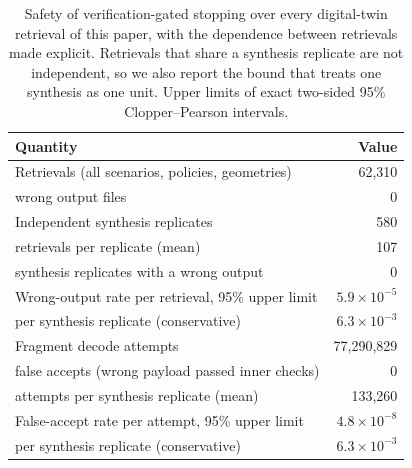\begin{table}[!t]
\centering
\caption{Safety of verification-gated stopping over every digital-twin retrieval of this paper, with the dependence between retrievals made explicit.  Retrievals that share a synthesis replicate are not independent, so we also report the bound that treats one synthesis as one unit.  Upper limits of exact two-sided 95\% Clopper--Pearson intervals.}
\label{tab:safety}
\scriptsize
\begin{tabular}{@{}lr@{}}
\toprule
Quantity & Value \\
\midrule
Retrievals (all scenarios{,} policies{,} geometries) & 62{,}310 \\
\quad wrong output files & 0 \\
Independent synthesis replicates & 580 \\
\quad retrievals per replicate (mean) & 107 \\
\quad synthesis replicates with a wrong output & 0 \\
Wrong-output rate per retrieval, 95\% upper limit & $5.9\times10^{-5}$ \\
\quad per synthesis replicate (conservative) & $6.3\times10^{-3}$ \\
\midrule
Fragment decode attempts & 77{,}290{,}829 \\
\quad false accepts (wrong payload passed inner checks) & 0 \\
\quad attempts per synthesis replicate (mean) & 133{,}260 \\
False-accept rate per attempt, 95\% upper limit & $4.8\times10^{-8}$ \\
\quad per synthesis replicate (conservative) & $6.3\times10^{-3}$ \\
\bottomrule
\end{tabular}
\end{table}
